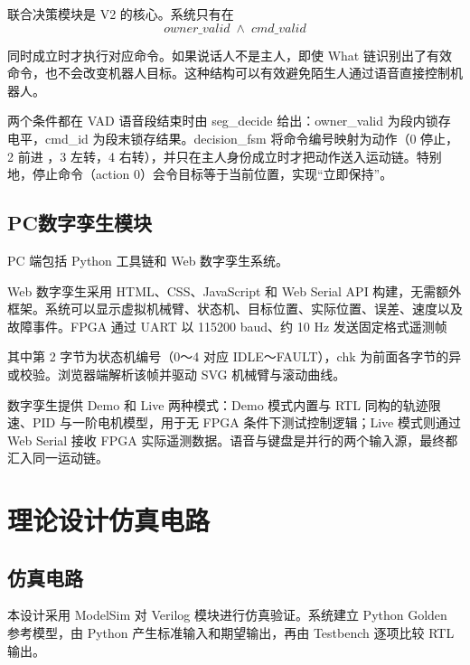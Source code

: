 \documentclass[UTF8,zihao=-4,fontset=windows]{ctexart}
\newcommand{\code}[1]{{\ttfamily #1}}
\begin{document}
联合决策模块是 V2 的核心。系统只有在
\[
owner\_valid \;\land\; cmd\_valid
\]

同时成立时才执行对应命令。如果说话人不是主人，即使 What 链识别出了有效命令，也不会改变机器人目标。这种结构可以有效避免陌生人通过语音直接控制机器人。

两个条件都在 VAD 语音段结束时由 \code{seg\_decide} 给出：\code{owner\_valid} 为段内锁存电平，\code{cmd\_id} 为段末锁存结果。\code{decision\_fsm} 将命令编号映射为动作（0 停止， 2 前进 ，3 左转，4 右转），并只在主人身份成立时才把动作送入运动链。特别地，停止命令（action 0）会令目标等于当前位置，实现“立即保持”。

\subsection{PC数字孪生模块}

PC 端包括 Python 工具链和 Web 数字孪生系统。

Web 数字孪生采用 HTML、CSS、JavaScript 和 Web Serial API 构建，无需额外框架。系统可以显示虚拟机械臂、状态机、目标位置、实际位置、误差、速度以及故障事件。FPGA 通过 UART 以 115200 baud、约 10 Hz 发送固定格式遥测帧

\begin{center}
\code{[AA][state][target][pos][chk]}
\end{center}

其中第 2 字节为状态机编号（0～4 对应 IDLE～FAULT），\code{chk} 为前面各字节的异或校验。浏览器端解析该帧并驱动 SVG 机械臂与滚动曲线。

数字孪生提供 Demo 和 Live 两种模式：Demo 模式内置与 RTL 同构的轨迹限速、PID 与一阶电机模型，用于无 FPGA 条件下测试控制逻辑；Live 模式则通过 Web Serial 接收 FPGA 实际遥测数据。语音与键盘是并行的两个输入源，最终都汇入同一运动链。
\section{理论设计仿真电路}

\subsection{仿真电路}

本设计采用 ModelSim 对 Verilog 模块进行仿真验证。系统建立 Python Golden 参考模型，由 Python 产生标准输入和期望输出，再由 Testbench 逐项比较 RTL 输出。
\end{document}
